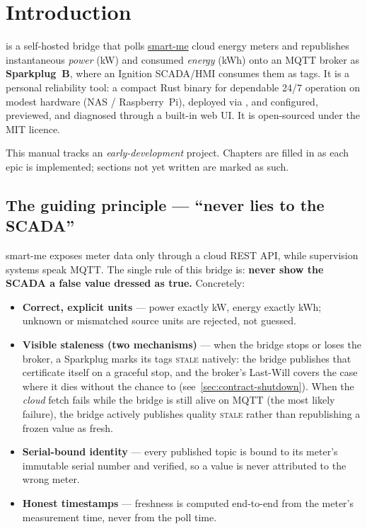 \chapter{Introduction}
\label{ch:intro}

\prog is a self-hosted bridge that polls \href{https://smart-me.com}{smart-me} cloud
energy meters and republishes instantaneous \emph{power} (kW) and consumed
\emph{energy} (kWh) onto an MQTT broker as \textbf{Sparkplug~B}, where an Ignition
SCADA/HMI consumes them as tags. It is a personal reliability tool: a compact Rust
binary for dependable 24/7 operation on modest hardware (NAS / Raspberry~Pi), deployed
via , and configured, previewed, and diagnosed through a built-in
web UI. It is open-sourced under the MIT licence.

\begin{warning}
This manual tracks an \emph{early-development} project. Chapters are filled in as each
epic is implemented; sections not yet written are marked as such.
\end{warning}

\section{The guiding principle — “never lies to the SCADA”}

smart-me exposes meter data only through a cloud REST API, while supervision systems
speak MQTT. The single rule of this bridge is: \textbf{never show the SCADA a false value
dressed as true.} Concretely:

\begin{itemize}
  \item \textbf{Correct, explicit units} — power exactly kW, energy exactly kWh; unknown
        or mismatched source units are rejected, not guessed.
  \item \textbf{Visible staleness (two mechanisms)} — when the bridge stops or loses the
        broker, a Sparkplug  marks its tags \textsc{stale} natively: the
        bridge publishes that certificate itself on a graceful stop, and the broker's
        Last-Will covers the case where it dies without the chance to
        (see~\ref{sec:contract-shutdown}). When the \emph{cloud} fetch fails while the
        bridge is still alive on MQTT (the most likely failure), the bridge actively
        publishes quality \textsc{stale} rather than republishing a frozen value as fresh.
  \item \textbf{Serial-bound identity} — every published topic is bound to its meter's
        immutable serial number and verified, so a value is never attributed to the wrong
        meter.
  \item \textbf{Honest timestamps} — freshness is computed end-to-end from the meter's
        measurement time, never from the poll time.
\end{itemize}

